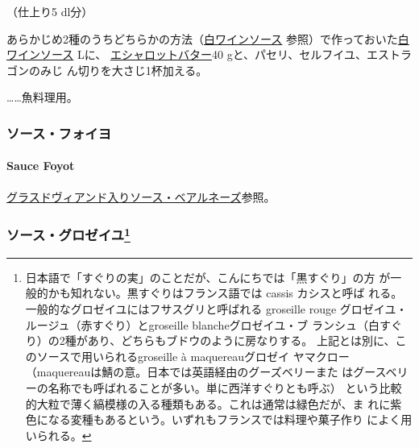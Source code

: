 \begin{recette}

（仕上り5 dl分）

あらかじめ2種のうちどちらかの方法（\protect\hyperlink{sauce-vin-blanc}{白ワインソース}
参照）で作っておいた\protect\hyperlink{sauce-vin-blanc}{白ワインソース}\undemi{}
Lに、 \protect\hyperlink{}{エシャロットバター}40
gと、パセリ、セルフイユ、エストラゴンのみじ
ん切りを大さじ1\undemi{}杯加える。

\ldots{}\ldots{}魚料理用。

\maeaki

\hypertarget{ux30bdux30fcux30b9ux30d5ux30a9ux30a4ux30e8}{%
\subsubsection{ソース・フォイヨ}\label{ux30bdux30fcux30b9ux30d5ux30a9ux30a4ux30e8}}

\hypertarget{sauce-foyot}{%
\paragraph{Sauce Foyot}\label{sauce-foyot}}

\protect\hyperlink{sauce-bearnaise-a-la-glace-de-viande}{グラスドヴィアンド入りソース・ベアルネーズ}参照。

\maeaki

\hypertarget{ux30bdux30fcux30b9ux30b0ux30edux30bcux30a4ux30e651}{%
\subsubsection[ソース・グロゼイユ]{\texorpdfstring{ソース・グロゼイユ\footnote{日本語で「すぐりの実」のことだが、こんにちでは「黒すぐり」の方
  が一般的かも知れない。黒すぐりはフランス語では cassis カシスと呼ば
  れる。一般的なグロゼイユにはフサスグリと呼ばれる groseille rouge
  グロゼイユ・ルージュ（赤すぐり）とgroseille blancheグロゼイユ・ブ
  ランシュ（白すぐり）の2種があり、どちらもブドウのように房なりする。
  上記とは別に、このソースで用いられるgroseille à maquereauグロゼイ
  ヤマクロー（maquereauは鯖の意。日本では英語経由のグーズベリーまた
  はグースベリーの名称でも呼ばれることが多い。単に西洋すぐりとも呼ぶ）
  という比較的大粒で薄く縞模様の入る種類もある。これは通常は緑色だが、ま
  れに紫色になる変種もあるという。いずれもフランスでは料理や菓子作り
  によく用いられる。}}{ソース・グロゼイユ}}\label{ux30bdux30fcux30b9ux30b0ux30edux30bcux30a4ux30e651}}


\end{recette}
